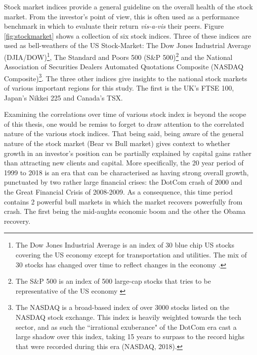Stock market indices provide a general guideline on the overall health of the stock market\citep{Lo21}.  From the investor's point of view, this is often used as a performance benchmark in which to evaluate their return \textit{vis-a-vis} their peers. Figure \ref{fig:stockmarket} shows a collection of six stock indices.  Three of these indices are used as bell-weathers of the US Stock-Market: The Dow Jones Industrial Average (DJIA/DOW)\footnote{The Dow Jones Industrial Average is an index of 30 blue chip US stocks covering the US economy except for transportation and utilities.  The mix of 30 stocks has changed over time to reflect changes in the economy \citep{DOW2020}.}, The Standard and Poors 500 (S\&P 500)\footnote{The S\&P 500 is an index of 500 large-cap stocks that tries to be representative of the US economy \citep{SNP2020}} and the National Association of Securities Dealers Automated Quotations Composite (NASDAQ Composite)\footnote{The NASDAQ is a broad-based index of over 3000 stocks listed on the NASDAQ stock exchange.  This index is heavily weighted towards the tech sector, and as such the ``irrational exuberance" of the DotCom era cast a large shadow over this index, taking 15 years to surpass to the record highs that were recorded during this era (NASDAQ, 2018)\nocite{NASDAQ2018}.}.   The three other indices give insights to the national stock markets of various important regions for this study.  The first is the UK's FTSE 100, Japan's Nikkei 225 and Canada's TSX.  

Examining the correlations over time of various stock index is beyond the scope of this thesis, one would be remiss to forget to draw attention to the correlated nature of the various stock indices.  That being said, being aware of the general nature of the stock market (Bear vs Bull market) gives context to whether growth in an investor's position can be partially explained by capital gains rather than attracting new clients and capital.  More specifically, the 20 year period of 1999 to 2018 is an era that can be characterised as having strong overall growth, punctuated by two rather large financial crises: the DotCom crash of 2000 and the Great Financial Crisis of 2008-2009.  As a consequence, this time period contains 2 powerful bull markets in which the market recovers powerfully from crash.  The first being the mid-aughts economic boom and the other the Obama recovery.




